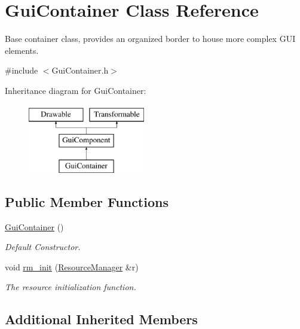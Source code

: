 \hypertarget{class_gui_container}{}\section{Gui\+Container Class Reference}
\label{class_gui_container}


Base container class, provides an organized border to house more complex G\+UI elements.  




{\ttfamily \#include $<$Gui\+Container.\+h$>$}

Inheritance diagram for Gui\+Container\+:\begin{figure}[H]
\begin{center}
\leavevmode
\includegraphics[height=3.000000cm]{class_gui_container}
\end{center}
\end{figure}
\subsection*{Public Member Functions}
\begin{DoxyCompactItemize}
\item 
\mbox{\label{class_gui_container_aa76c191132371ff7186ca5ef344da9bd}} 
\mbox{\hyperlink{class_gui_container_aa76c191132371ff7186ca5ef344da9bd}{Gui\+Container}} ()
\begin{DoxyCompactList}\small\item\em Default Constructor. \end{DoxyCompactList}\item 
void \mbox{\hyperlink{class_gui_container_af800879fd21fae9d7fef5257fb1fcd5e}{rm\+\_\+init}} (\mbox{\hyperlink{class_resource_manager}{Resource\+Manager}} \&r)
\begin{DoxyCompactList}\small\item\em The resource initialization function. \end{DoxyCompactList}\end{DoxyCompactItemize}
\subsection*{Additional Inherited Members}


